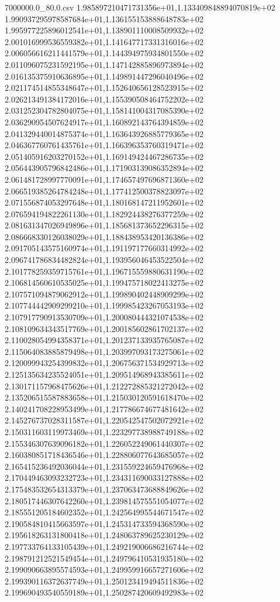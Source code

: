 \begin{filecontents*}{7000000.0_80.0.csv}
1.985897210471731356e+01,1.133409848894070819e+02
1.990937295978587684e+01,1.136155153888648783e+02
1.995977225896012541e+01,1.138901110008509932e+02
2.001016999536559382e+01,1.141647717331316016e+02
2.006056616211441579e+01,1.144394975934801550e+02
2.011096075231592195e+01,1.147142885896973894e+02
2.016135375910636895e+01,1.149891447296040496e+02
2.021174514855348647e+01,1.152640656128523915e+02
2.026213491384172016e+01,1.155390508464752202e+02
2.031252304782804075e+01,1.158141004317085390e+02
2.036290954507624917e+01,1.160892143764394859e+02
2.041329440014875374e+01,1.163643926885779365e+02
2.046367760761435761e+01,1.166396353760319471e+02
2.051405916203270152e+01,1.169149424467286735e+02
2.056443905796842486e+01,1.171903139086352894e+02
2.061481728997770091e+01,1.174657497696871360e+02
2.066519385264784248e+01,1.177412500378823097e+02
2.071556874053297648e+01,1.180168147211952601e+02
2.076594194822261130e+01,1.182924438276377259e+02
2.081631347026949896e+01,1.185681373652296315e+02
2.086668330126038029e+01,1.188438953420136386e+02
2.091705143575160974e+01,1.191197177660314992e+02
2.096741786834482824e+01,1.193956046453522504e+02
2.101778259359715761e+01,1.196715559880631190e+02
2.106814560610535025e+01,1.199475718022413275e+02
2.107571094879062912e+01,1.199890402448909299e+02
2.107744442909299210e+01,1.199985423267053193e+02
2.107917790913530709e+01,1.200080444321074538e+02
2.108109634343517769e+01,1.200185602861702137e+02
2.110028054994358371e+01,1.201237133935765087e+02
2.115064083885879498e+01,1.203997093173275061e+02
2.120099943254399832e+01,1.206756371534929713e+02
2.125135634235524051e+01,1.209514968943385611e+02
2.130171157968475626e+01,1.212272885321272042e+02
2.135206515587883658e+01,1.215030120591618470e+02
2.140241708228953499e+01,1.217786674677481642e+02
2.145276737028311587e+01,1.220542547502072921e+02
2.150311603119973469e+01,1.223297738988749188e+02
2.155346307639096182e+01,1.226052249061440307e+02
2.160380851718436546e+01,1.228806077643685057e+02
2.165415236492036044e+01,1.231559224659476968e+02
2.170449463093232723e+01,1.234311690033127888e+02
2.175483532654313379e+01,1.237063473688849626e+02
2.180517446307642260e+01,1.239814575551054077e+02
2.185551205184602352e+01,1.242564995544671547e+02
2.190584810415663597e+01,1.245314733594368590e+02
2.195618263131800418e+01,1.248063789625230129e+02
2.197733764133105439e+01,1.249219006686216744e+02
2.198791212521549454e+01,1.249796410531935180e+02
2.199090663895574593e+01,1.249959916657271606e+02
2.199390116372637749e+01,1.250123419494511836e+02
2.199690493540559189e+01,1.250287420609492983e+02

\end{filecontents*}
